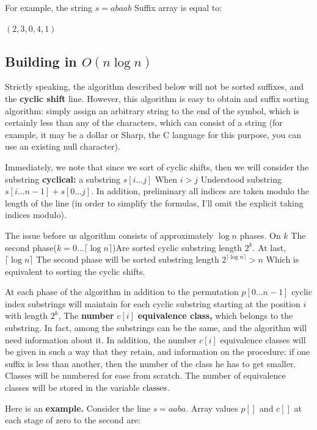 For example, the string $s = abaab$ Suffix array is equal to:

$(2,3,0,4,1)$

\subsection{ Building in $O (n \log n)$}

Strictly speaking, the algorithm described below will not be sorted suffixes, and the \textbf{cyclic shift} line. However, this algorithm is easy to obtain and suffix sorting algorithm: simply assign an arbitrary string to the end of the symbol, which is certainly less than any of the characters, which can consist of a string (for example, it may be a dollar or Sharp, the C language for this purpose, you can use an existing null character).

Immediately, we note that since we sort of cyclic shifts, then we will consider the substring \textbf{cyclical:} a substring $s [i \ldots j]$ When $i> j$ Understood substring $s [i \ldots n-1] + s [0 \ldots j]$. In addition, preliminary all indices are taken modulo the length of the line (in order to simplify the formulas, I'll omit the explicit taking indices modulo).

The issue before us algorithm consists of approximately $\log n$ phases. On $k$ The second phase($k = 0 \ldots \lceil \log n \rceil$)Are sorted cyclic substring length $2 ^ k$. At last, $\lceil \log n \rceil$ The second phase will be sorted substring length $2 ^ {\lceil \log n \rceil}> n$ Which is equivalent to sorting the cyclic shifts.

At each phase of the algorithm in addition to the permutation $p [0 \ldots n-1]$ cyclic index substrings will maintain for each cyclic substring starting at the position $i$ with length $2 ^ k$, The \textbf{number} \textbf{$c [i]$} \textbf{equivalence class,} which belongs to the substring. In fact, among the substrings can be the same, and the algorithm will need information about it. In addition, the number $c [i]$ equivalence classes will be given in such a way that they retain, and information on the procedure: if one suffix is ​​less than another, then the number of the class he has to get smaller. Classes will be numbered for ease from scratch. The number of equivalence classes will be stored in the variable $\rm classes$.

Here is an \textbf{example.} Consider the line $s = aaba$. Array values $p []$ and $c []$ at each stage of zero to the second are:

